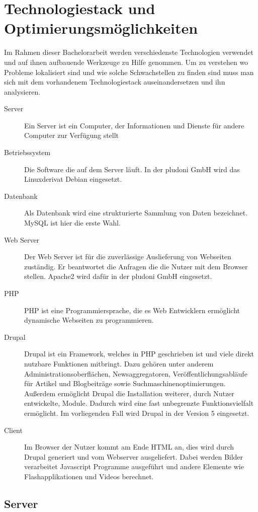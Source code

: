 \section{Technologiestack und Optimierungsmöglichkeiten}
Im Rahmen dieser Bachelorarbeit werden verschiedenste Technologien verwendet und auf ihnen aufbauende Werkzeuge zu Hilfe genommen. Um zu verstehen wo Probleme lokalisiert sind und wie solche Schwachstellen zu finden sind muss man sich mit dem vorhandenem Technologiestack auseinandersetzen und ihn analysieren.
\begin{description}
  \item[Server] Ein Server ist ein Computer, der Informationen und Dienste für andere Computer zur Verfügung stellt
  \item[Betriebssystem] Die Software die auf dem Server läuft. In der pludoni GmbH wird das Linuxderivat Debian eingesetzt.
  \item[Datenbank] Als Datenbank wird eine strukturierte Sammlung von Daten bezeichnet. MySQL ist hier die erste Wahl.
  \item[Web Server] Der Web Server ist für die zuverlässige Auslieferung von Webseiten zuständig. Er beantwortet die Anfragen die die Nutzer mit dem Browser stellen. Apache2 wird dafür in der pludoni GmbH eingesetzt.
  \item[PHP] PHP ist eine Programmiersprache, die es Web Entwicklern ermöglicht dynamische Webseiten zu programmieren.
  \item[Drupal] Drupal ist ein Framework, welches in PHP geschrieben ist und viele direkt nutzbare Funktionen mitbringt. Dazu gehören unter anderem Administrationsoberflächen, Newsaggregatoren, Veröffentlichungsabläufe für Artikel und Blogbeiträge sowie Suchmaschinenoptimierungen. Außerdem ermöglicht Drupal die Installation weiterer, durch Nutzer entwickelte, Module. Dadurch wird eine fast unbegrenzte Funktionsvielfalt ermöglicht. Im vorliegenden Fall wird Drupal in der Version 5 eingesetzt.
  \item[Client] Im Browser der Nutzer kommt am Ende HTML an, dies wird durch Drupal generiert und vom Webserver ausgeliefert. Dabei werden Bilder verarbeitet Javascript Programme ausgeführt und andere Elemente wie Flashapplikationen und Videos berechnet. 
\end{description}



\subsection{Server}
